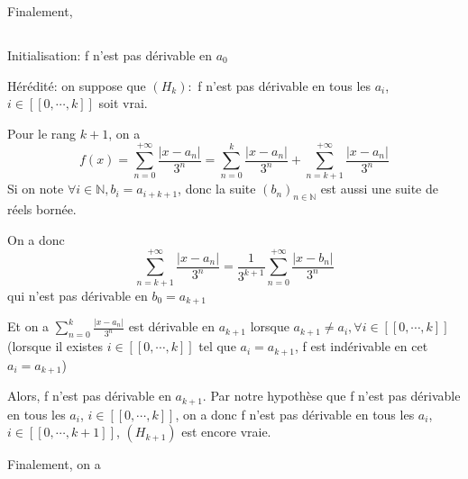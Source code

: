 \documentclass[a4paper,12pt]{book}
\begin{document}
Finalement, 
\subsection{}
Initialisation: f n'est pas dérivable en $a_0$

Hérédité: on suppose que $(H_k):$ f n'est pas dérivable en tous les $a_i$, $i \in [\![0,\cdots,k]\!]$ soit vrai.

Pour le rang $k+1$, on a 
$$f(x)=\sum_{n=0}^{+\infty}\frac{|x-a_n|}{3^n}=\sum_{n=0}^{k}\frac{|x-a_n|}{3^n}+\sum_{n=k+1}^{+\infty}\frac{|x-a_n|}{3^n}$$
Si on note $\forall i \in \mathbb{N}, b_i=a_{i+k+1}$, donc la suite $(b_n)_{n \in \mathbb{N}}$ est aussi une suite de réels bornée. 

On a donc 
$$
\sum_{n=k+1}^{+\infty}\frac{|x-a_n|}{3^n}=\frac{1}{3^{k+1}}\sum_{n=0}^{+\infty}\frac{|x-b_n|}{3^n}
$$
qui n'est pas dérivable en $b_0=a_{k+1}$

Et on a $\sum_{n=0}^{k}\frac{|x-a_n|}{3^n}$ est dérivable en $a_{k+1}$ lorsque $a_{k+1} \neq a_i, \forall i \in [\![0,\cdots,k]\!]$
(lorsque il existes $ i \in [\![0,\cdots,k]\!]$ tel que $a_i=a_{k+1}$, f est indérivable en cet $a_i=a_{k+1}$)

Alors, f n'est pas dérivable en $a_{k+1}$. Par notre hypothèse que f n'est pas dérivable en tous les $a_i$, $i \in [\![0,\cdots,k]\!]$, 
on a donc f n'est pas dérivable en tous les $a_i$, $i \in [\![0,\cdots,k+1]\!]$, $(H_{k+1})$ est encore vraie.

Finalement, on a 
\end{document}
